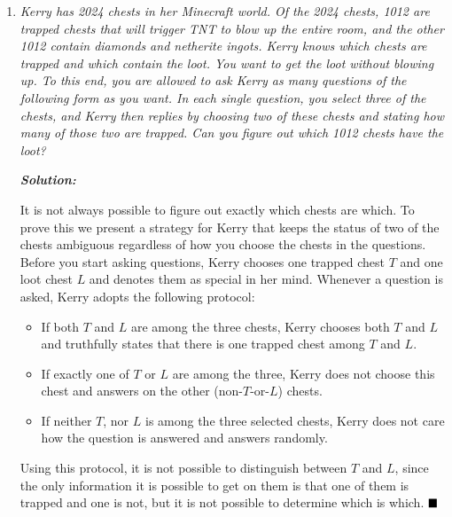 \documentclass[12pt]{article}
\newcommand{\sol}{\textbf{\textit{Solution: }}}
\begin{document}
\begin{enumerate}[topsep=2\bigskipamount,itemsep=\bigskipamount]
\sol

Let the angle bisector of $\angle ADC$ intersect $AC$ at $E$. By the tan-chord theorem, $\angle ABD=\angle EDA = \angle EDC$, so $DE\parallel AB$. By alternate angles, we get $\angle EDA=\angle DAB$, so $\triangle ADB$ is isosceles and $DA=DB=DC$ (because $D$ is the midpoint of $BC$). Therefore, $D$ is the centre of a circle passing through $A,B,C$, but $BC$ is the diameter of this circle, so by the theorem of Thales, $\angle BAC=90^{\circ}$. $\hfill\blacksquare$

\item \textit{Kerry has 2024 chests in her Minecraft world.
Of the 2024 chests, 1012 are trapped chests that will trigger TNT to blow up the entire room, and the other 1012 contain diamonds and netherite ingots.
Kerry knows which chests are trapped and which contain the loot.
You want to get the loot without blowing up.
To this end, you are allowed to ask Kerry as many questions of the following form as you want.
In each single question, you select three of the chests, and Kerry then replies by choosing two of these chests and stating how many of those two are trapped.
Can you figure out which 1012 chests have the loot?}

\sol

It is not always possible to figure out exactly which chests are which. To prove this we present a strategy for Kerry that keeps the status of two of the chests ambiguous regardless of how you choose the chests in the questions. Before you start asking questions, Kerry chooses one trapped chest $T$ and one loot chest $L$ and denotes them as special in her mind. Whenever a question is asked, Kerry adopts the following protocol:
\begin{itemize}
    \item If both $T$ and $L$ are among the three chests, Kerry chooses both $T$ and $L$ and truthfully states that there is one trapped chest among $T$ and $L$.
    \item If exactly one of $T$ or $L$ are among the three, Kerry does not choose this chest and answers on the other (non-$T$-or-$L$) chests.
    \item If neither $T$, nor $L$ is among the three selected chests, Kerry does not care how the question is answered and answers randomly.
\end{itemize} Using this protocol, it is not possible to distinguish between $T$ and $L$, since the only information it is possible to get on them is that one of them is trapped and one is not, but it is not possible to determine which is which. $\hfill\blacksquare$


\end{enumerate}
\end{document}
